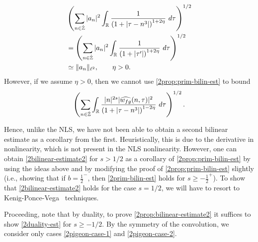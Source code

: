 \begin{equation*}
	\begin{split}
		& \left( \sum_{n \in \zzdot} | a_{n} |^2\int_{\rr} \frac{1}{\left( 1 + | \tau -
		n^3 | \right)^{1 + 2 \eta}} \ d \tau  
		\right)^{1/2} 
		\\
		& = \left ( \sum_{n \in \zzdot}
		| a_n |^2 
		\int_{\rr} \frac{1}{\left( 1 + | \tau' | \right)^{1 + 2 \eta}} \ d 
		\tau \right)^{1/2}
		\\
		& \simeq \|a_n\|_{\ell^2}, \qquad \eta >0.
		\end{split}
\end{equation*}
However, if we assume $\eta >0$, then
we cannot use \cref{2prop:prim-bilin-est} to bound
\begin{equation*}
	\begin{split}
		\left ( \sum_{n \in \dot{\mathbb{Z}}}\int_{\mathbb{R}} \frac{|n|^{2s} | \widehat{w_{fg}}(n, \tau) 
		|^2}{\left( 1 + | \tau - n^3 | \right)^{1 - 2\eta}}\ d \tau
		\right)^{1/2}. 
	\end{split}
\end{equation*}
\begin{remark}
Hence, unlike the NLS, we have not been able to obtain a second bilinear
estimate as a corollary from the first. Heuristically, this is due to the
derivative in nonlinearity, which is not present in the NLS nonlinearity.
However, one can obtain \eqref{2bilinear-estimate2} for $s>1/2$ as a
corollary of \cref{2prop:prim-bilin-est} by using the ideas
above and by modifying the proof of \cref{2prop:prim-bilin-est} slightly (i.e.,
showing that if $b = \frac{1}{2}^-$, then \eqref{2prim-bilin-est} holds for
$s\ge-\frac{1}{2}^+$). To show that \eqref{2bilinear-estimate2} holds for the
case $s=1/2$, we will have to resort to Kenig-Ponce-Vega~\cite{Kenig:1996aa} techniques.
\end{remark}
%
%
Proceeding, note that by duality, to prove \cref{2prop:bilinear-estimate2} it
suffices to show \eqref{2duality-est} for $s \ge -1/2$. By the symmetry of the convolution, we
consider only cases \eqref{2pigeon-case-1} and \eqref{2pigeon-case-2}.
%
%
